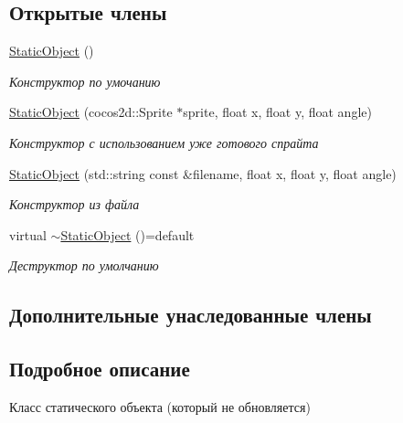 \subsection*{Открытые члены}
\begin{DoxyCompactItemize}
\item 
\mbox{\label{classrtm_1_1_static_object_a28d0f4f8205c5ad132afca9ecfc9143e}} 
\hyperlink{classrtm_1_1_static_object_a28d0f4f8205c5ad132afca9ecfc9143e}{Static\+Object} ()
\begin{DoxyCompactList}\small\item\em Конструктор по умочанию \end{DoxyCompactList}\item 
\hyperlink{classrtm_1_1_static_object_a98a64488b482ca02b10c0f1fed4fcad0}{Static\+Object} (cocos2d\+::\+Sprite $\ast$sprite, float x, float y, float angle)
\begin{DoxyCompactList}\small\item\em Конструктор с использованием уже готового спрайта \end{DoxyCompactList}\item 
\hyperlink{classrtm_1_1_static_object_af17012380ecde141998deadea57acd79}{Static\+Object} (std\+::string const \&filename, float x, float y, float angle)
\begin{DoxyCompactList}\small\item\em Конструктор из файла \end{DoxyCompactList}\item 
\mbox{\label{classrtm_1_1_static_object_ab7ae519ee89a02f8ce1178af045bdb7f}} 
virtual \hyperlink{classrtm_1_1_static_object_ab7ae519ee89a02f8ce1178af045bdb7f}{$\sim$\+Static\+Object} ()=default
\begin{DoxyCompactList}\small\item\em Деструктор по умолчанию \end{DoxyCompactList}\end{DoxyCompactItemize}
\subsection*{Дополнительные унаследованные члены}


\subsection{Подробное описание}
Класс статического объекта (который не обновляется) 

